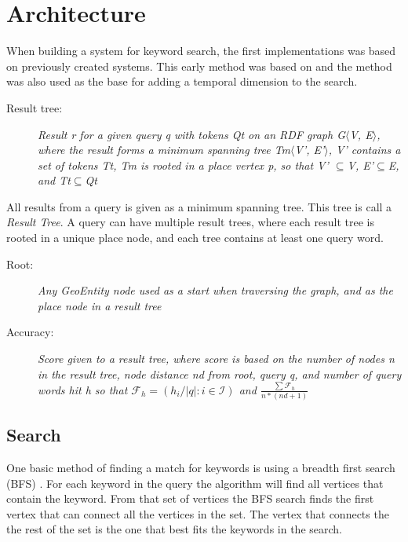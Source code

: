 \chapter{Architecture}
\label{cha:architecture}

When building a system for keyword search, the first implementations was based on previously created systems. This early method was based on \cite{Shi:2016:TRS:2882903.2882941} and the method was also used as the base for adding a temporal dimension to the search.

\begin{description}
    \item[Result tree:] {\em Result r for a given query q with tokens Qt on an RDF graph G$\langle$V, E$\rangle$, where the result forms a minimum spanning tree Tm$\langle$V', E'$\rangle$, V' contains a set of tokens Tt, Tm is rooted in a place vertex p, so that V' $\subseteq$V, E'$\subseteq$E, and Tt$\subseteq$Qt}
\end{description}
All results from a query is given as a minimum spanning tree. This tree is call a {\em Result Tree}. A query can have multiple result trees, where each result tree is rooted in a unique place node, and each tree contains at least one query word.

\begin{description}
    \item[Root:] {\em Any GeoEntity node used as a start when traversing the graph, and as the place node in a result tree}
\end{description}

\begin{description}
    \item[Accuracy:] {\em Score given to a result tree, where score is based on the number of nodes n in the result tree, node distance nd from root, query q, and number of query words hit h so that $\mathcal{F}_h = (h_i/\left\lvert q \right\rvert : i \in \mathcal{I})$ and $ \frac{\sum \mathcal{F}_h}{n*(nd+1)}$}
\end{description}

\section{Search}
One basic method of finding a match for keywords is using a breadth first search (BFS) \citep{blinks, Shi:2016:TRS:2882903.2882941}. For each keyword in the query the algorithm will find all vertices that contain the keyword. From that set of vertices the BFS search finds the first vertex that can connect all the vertices in the set. The vertex that connects the the rest of the set is the one that best fits the keywords in the search.


